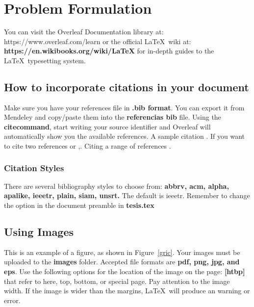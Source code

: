 
\chapter{Problem Formulation}  

\noindent You can visit the Overleaf Documentation library at: https://www.overleaf.com/learn or the official \LaTeX\ wiki at: \textbf{https://en.wikibooks.org/wiki/LaTeX} for in-depth guides to the \LaTeX\ typesetting system.

\section{How to incorporate citations in your document}


\noindent Make sure you have your references file in \textbf{.bib format}. You can export it from Mendeley and copy/paste them into the \textbf{referencias bib} file. Using the \textbf{citecommand}, start writing your source identifier and Overleaf will automatically show you the available references. A sample citation \cite{dirac}. If you want to cite two references \cite{einstein,knuth-fa} or \cite{einstein},\cite{knuth-fa}. Citing a range of references \cite{einstein,knuth-fa,radiation2}.


\subsection{Citation Styles}
\noindent There are several bibliography styles to choose from: \textbf{abbrv, acm, alpha, apalike, ieeetr, plain, siam, unsrt.} The default is ieeetr. Remember to change the option in the document preamble in \textbf{tesis.tex} %


\section{Using Images}





\noindent This is an example of a figure, as shown in Figure~\ref{gric}. Your images must be uploaded to the \textbf{images} folder. Accepted file formats are \textbf{pdf, png, jpg, and eps}. Use the following options for the location of the image on the page: \textbf{[htbp]} that refer to here, top, bottom, or special page. Pay attention to the image width. If the image is wider than the margins, \LaTeX\ will produce an warning or error.

